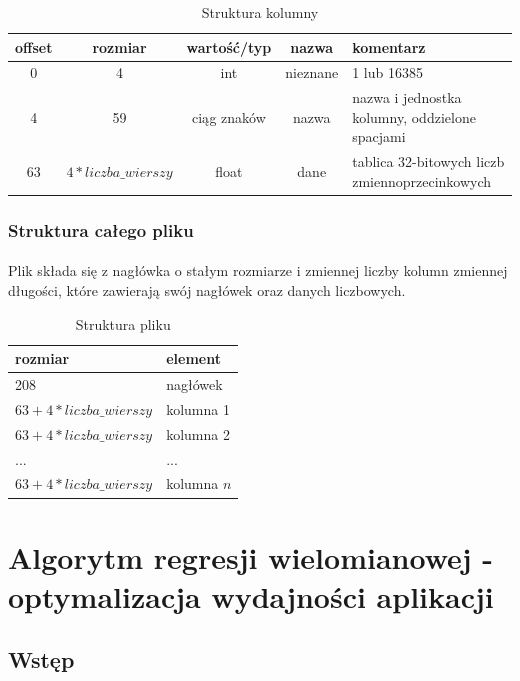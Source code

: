 \documentclass[12pt]{report}
\begin{document}
	\begin{table}[H]
		\centering
		\caption{Struktura kolumny}
		\begin{tabular}{|c|c|c|c|p{6.5cm}|} \hline
			offset & rozmiar & wartość/typ & nazwa & komentarz \\\hline
			\hline
			0 & 4 & int & nieznane & 1 lub 16385  \\\hline
			4 & 59 & ciąg znaków & nazwa & nazwa i jednostka kolumny, oddzielone spacjami \\\hline
			63 & $4 * liczba\_wierszy$ & float & dane & tablica 32-bitowych liczb zmiennoprzecinkowych \\\hline
		\end{tabular}
	\end{table}
	
	\subsubsection{Struktura całego pliku}
	\paragraph{}
	Plik składa się z nagłówka o stałym rozmiarze i zmiennej liczby kolumn zmiennej długości, które zawierają swój nagłówek oraz danych liczbowych.
	
	\begin{table}[H]
		\centering
		\caption{Struktura pliku}
		\begin{tabular}{|p{5cm}|p{4cm}|} \hline
			rozmiar  & element \\\hline
			\hline
			208 & nagłówek  \\\hline
			$63+4*liczba\_wierszy$  & kolumna 1 \\\hline
			$63+4*liczba\_wierszy$  & kolumna 2 \\\hline
			...  & ... \\\hline
			$63+4*liczba\_wierszy$  & kolumna $n$ \\\hline
		\end{tabular}
	\end{table}
	
	\pagebreak
	\section{Algorytm regresji wielomianowej - optymalizacja wydajności aplikacji}
	\subsection{Wstęp}
\end{document}
